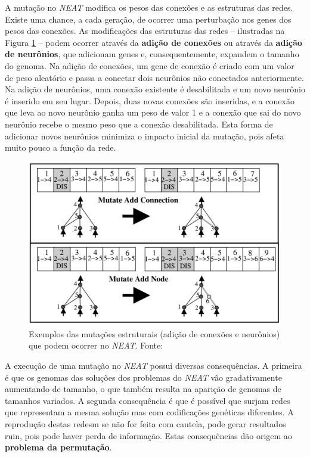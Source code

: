 A mutação no \textit{NEAT} modifica os pesos das conexões e as estruturas das
redes. Existe uma chance, a cada geração, de ocorrer uma perturbação nos genes
dos pesos das conexões. As modificações das estruturas das redes -- ilustradas
na Figura \ref{fig:neat-structural-mutation} -- podem ocorrer através da
\textbf{adição de conexões} ou através da \textbf{adição de neurônios}, que
adicionam genes e, consequentemente, expandem o tamanho do genoma. Na adição de
conexões, um gene de conexão é criado com um valor de peso aleatório e passa a
conectar dois neurônios não conectados anteriormente. Na adição de neurônios,
uma conexão existente é desabilitada e um novo neurônio é inserido em seu lugar.
Depois, duas novas conexões são inseridas, e a conexão que leva ao novo neurônio
ganha um peso de valor 1 e a conexão que sai do novo neurônio recebe o mesmo
peso que a conexão desabilitada. Esta forma de adicionar novos neurônios
minimiza o impacto inicial da mutação, pois afeta muito pouco a função da rede.

\begin{figure}[H]
\centering
\includegraphics[width=\textwidth]{fig/neat-mutation-examples.pdf}
\caption{Exemplos das mutações estruturais (adição de conexões e neurônios) que
podem ocorrer no \textit{NEAT}. Fonte: \cite{stanley:ec02}}
\label{fig:neat-structural-mutation}
\end{figure}

A execução de uma mutação no \textit{NEAT} possui diversas consequências. A
primeira é que os genomas das soluções dos problemas do \textit{NEAT} vão
gradativamente aumentando de tamanho, o que também resulta na aparição de
genomas de tamanhos variados. A segunda consequência é que é possível que surjam
redes que representam a mesma solução mas com codificações genéticas diferentes.
A reprodução destas redesm se não for feita com cautela, pode gerar resultados
ruin, pois pode haver perda de informação. Estas consequências dão origem ao
\textbf{problema da permutação}.

